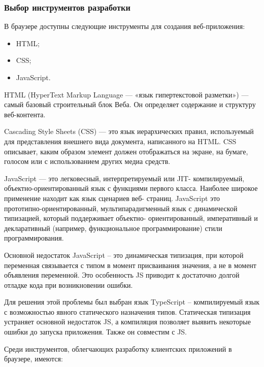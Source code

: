 
\subsubsection{Выбор инструментов разработки}

В браузере доступны следующие инструменты для создания веб-приложения:
\begin{itemize}
	\item HTML;
	\item CSS;
	\item JavaScript.
\end{itemize}

HTML (HyperText Markup Language — «язык гипертекстовой разметки»)
— самый базовый строительный блок Веба. Он определяет содержание и
структуру веб-контента.

Cascading Style Sheets (CSS) — это язык иерархических правил,
используемый для представления внешнего вида документа, написанного на
HTML. CSS описывает, каким образом элемент должен отображаться на
экране, на бумаге, голосом или с использованием других медиа средств.

JavaScript — это легковесный, интерпретируемый или JIT-
компилируемый, объектно-ориентированный язык с функциями первого
класса. Наиболее широкое применение находит как язык сценариев веб-
страниц. JavaScript это прототипно-ориентированный, мультипарадигменный
язык с динамической типизацией, который поддерживает объектно-
ориентированный, императивный и декларативный (например,
функциональное программирование) стили программирования.

Основной недостаток JavaScript – это динамическая типизация, при
которой переменная связывается с типом в момент присваивания значения, а
не в момент объявления переменной. Это особенность JS приводит к
достаточно долгой отладке кода при возникновении ошибки.

Для решения этой проблемы был выбран язык TypeScript –
компилируемый язык с возможностью явного статического назначения типов.
Статическая типизация устраняет основной недостаток JS, а компиляция
позволяет выявить некоторые ошибки до запуска приложения. Также он
совместим с JS.

Среди инструментов, облегчающих разработку клиентских приложений
в браузере, имеются:

